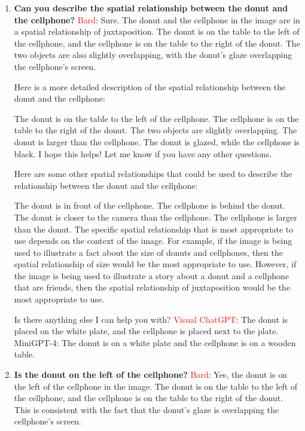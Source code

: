     \begin{enumerate}
        \item \textbf{Can you describe the spatial relationship between the donut and the cellphone?}
        \subitem \textcolor{Red}{Bard}: Sure. The donut and the cellphone in the image are in a spatial relationship of juxtaposition. The donut is on the table to the left of the cellphone, and the cellphone is on the table to the right of the donut. The two objects are also slightly overlapping, with the donut's glaze overlapping the cellphone's screen.

        Here is a more detailed description of the spatial relationship between the donut and the cellphone:
        
        The donut is on the table to the left of the cellphone.
        The cellphone is on the table to the right of the donut.
        The two objects are slightly overlapping.
        The donut is larger than the cellphone.
        The donut is glazed, while the cellphone is black.
        I hope this helps! Let me know if you have any other questions.
        
        Here are some other spatial relationships that could be used to describe the relationship between the donut and the cellphone:
        
        The donut is in front of the cellphone.
        The cellphone is behind the donut.
        The donut is closer to the camera than the cellphone.
        The cellphone is larger than the donut.
        The specific spatial relationship that is most appropriate to use depends on the context of the image. For example, if the image is being used to illustrate a fact about the size of donuts and cellphones, then the spatial relationship of size would be the most appropriate to use. However, if the image is being used to illustrate a story about a donut and a cellphone that are friends, then the spatial relationship of juxtaposition would be the most appropriate to use.
        
        Is there anything else I can help you with?
        \subitem \textcolor{red}{Visual ChatGPT}: The donut is placed on the white plate, and the cellphone is placed next to the plate.
        \subitem MiniGPT-4: The donut is on a white plate and the cellphone is on a wooden table.
        \item \textbf{Is the donut on the left of the cellphone?}
        \subitem \textcolor{Red}{Bard}: 
        Yes, the donut is on the left of the cellphone in the image. The donut is on the table to the left of the cellphone, and the cellphone is on the table to the right of the donut. This is consistent with the fact that the donut's glaze is overlapping the cellphone's screen.
        

\end{enumerate}

